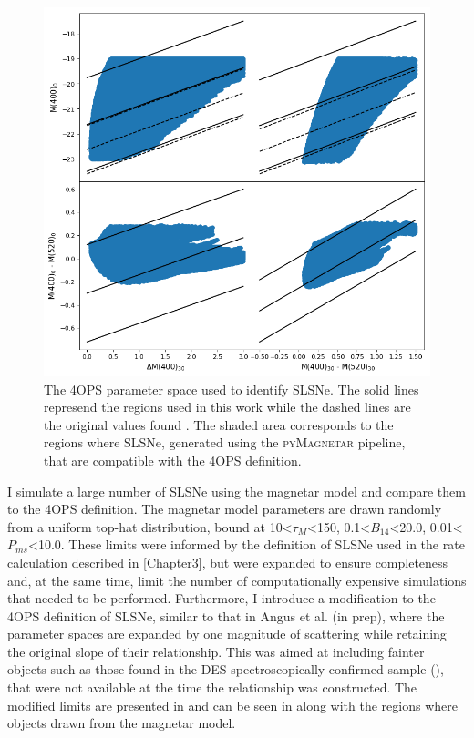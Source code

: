 \begin{figure}
  \includegraphics[width=\textwidth]{Figures/Chapter5/4ops.png}
  \caption{The 4OPS parameter space used to identify SLSNe. The solid lines represend the regions used in this work while the dashed lines are the original values found \citet{Inserra2018a}. The shaded area corresponds to the regions where SLSNe, generated using the \textsc{pyMagnetar} pipeline, that are compatible with the 4OPS definition.}
  \label{fig:4OPS}
\end{figure}

I simulate a large number of SLSNe using the magnetar model and compare them to the 4OPS definition. The magnetar model parameters are drawn randomly from a uniform top-hat distribution, bound at 10<$\tau_M$<150, 0.1<$B_{14}$<20.0, 0.01<$P_{ms}$<10.0. These limits were informed by the definition of SLSNe used in the rate calculation described in \cref{Chapter3}, but were expanded to ensure completeness and, at the same time, limit the number of computationally expensive simulations that needed to be performed. Furthermore, I introduce a modification to the 4OPS definition of SLSNe, similar to that in Angus et al. (in prep), where the parameter spaces are expanded by one magnitude of scattering while retaining the original slope of their relationship. This was aimed at including fainter objects such as those found in the DES spectroscopically confirmed sample (), that were not available at the time the relationship was constructed. The modified limits are presented in  and can be seen in  along with the regions where objects drawn from the magnetar model.

